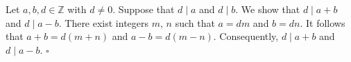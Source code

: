 Let $a, b, d \in \mathbb{Z}$ with $d \neq 0$.
Suppose that $d \mid a$ and $d \mid b$.
We show that $d \mid a + b$ and $d \mid a - b$.
There exist integers $m$, $n$ such that $a = dm$ and $b = dn$.
It follows that $a + b = d(m + n)$ and $a - b = d(m - n)$.
Consequently, $d \mid a + b$ and $d \mid a - b$. \hfill$\square$